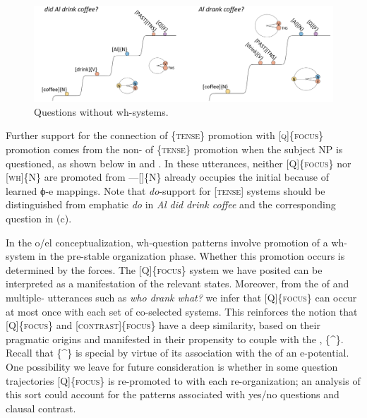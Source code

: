   
\begin{figure}
\includegraphics[width=\textwidth]{figures/Tilsen-img160.png}
\caption{Questions without wh-systems.}
\label{fig:7:16}
\end{figure}
 

  Further support for the connection of \{\textsc{tense}\} promotion with [\textsc{q}]\{\textsc{focus}\} promotion comes from the non- of \{\textsc{tense}\} promotion when the subject NP is questioned, as shown below in  and . In these utterances, neither [Q]\{\textsc{focus}\} nor [\textsc{wh}]\{N\} are promoted from —[]\{N\} already occupies the initial  because of learned ϕ-e mappings. Note that \textit{do}{}-support for [\textsc{tense}] systems should be distinguished from emphatic \textit{do} in \textit{Al did drink coffee} and the corresponding question in (c).  

\ea\label{ex:7:18}
   \label{ex:7:18a}
  \label{ex:7:18b}
  \label{ex:7:18c}
  \z
\z

  In the o/el conceptualization, wh-question patterns involve promotion of a wh-system in the pre-stable organization phase. Whether this promotion occurs is determined by the  forces. The [\textsc{Q}]\{\textsc{focus}\} system we have posited can be interpreted as a manifestation of the relevant  states. Moreover, from the  of  and multiple- utterances such as \textit{who drank what?} we infer that [Q]\{\textsc{focus}\} can occur at most once with each set of co-selected systems. This reinforces the notion that [Q]\{\textsc{focus}\} and [\textsc{contrast}]\{\textsc{focus}\} have a deep similarity, based on their pragmatic origins and manifested in their propensity to couple with the , \{\^{}\}. Recall that \{\^{}\} is special by virtue of its association with the  of an e-potential. One possibility we leave for future consideration is whether in some question trajectories [Q]\{\textsc{focus}\} is re-promoted to  with each re-organization; an analysis of this sort could account for the  patterns associated with yes/no questions and clausal contrast.

